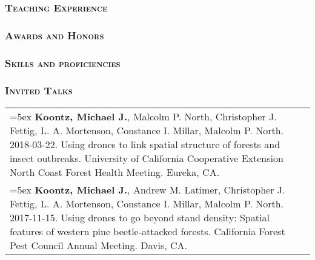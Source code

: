 \documentclass[10pt,english]{article}
\providecommand{\tabularnewline}{\\}
\begin{document}
\vspace{1ex}


\subsubsection*{\textsc{Teaching Experience}}
\vspace{-0.5ex}


\vspace{1ex}


\subsubsection*{\textsc{Awards and Honors}}


\vspace{1ex}


\subsubsection*{\textsc{Skills and proficiencies}}
\vspace{-0.5ex}


\vspace{1ex}


\subsubsection*{\textsc{Invited Talks}}
\vspace{-0.5ex}

\renewcommand{\arraystretch}{1.2}
\begin{tabularx}{\textwidth}{@{}>{\raggedright}p{5.25in} >{\raggedleft}X@{}}

\hangindent=5ex \textbf{Koontz, Michael J.}, Malcolm P. North, Christopher J. Fettig, L. A. Mortenson, Constance I. Millar, Malcolm P. North. 2018-03-22. Using drones to link spatial structure of forests and insect outbreaks. University of California Cooperative Extension North Coast Forest Health Meeting. Eureka, CA. & 2018 \tabularnewline

\hangindent=5ex \textbf{Koontz, Michael J.}, Andrew M. Latimer, Christopher J. Fettig, L. A. Mortenson, Constance I. Millar, Malcolm P. North. 2017-11-15. Using drones to go beyond stand density: Spatial features of western pine beetle-attacked forests. California Forest Pest Council Annual Meeting. Davis, CA. & 2017

\end{tabularx}
\vspace{1ex}
\end{document}
